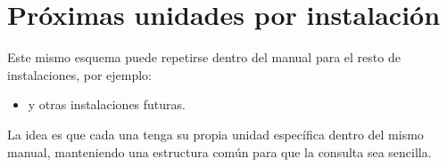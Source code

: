 \documentclass[12pt,a4paper]{article}
\begin{document}
\section{Próximas unidades por instalación}

Este mismo esquema puede repetirse dentro del manual para el resto de instalaciones, por ejemplo:

\begin{itemize}
\item y otras instalaciones futuras.
\end{itemize}

La idea es que cada una tenga su propia unidad específica dentro del mismo manual, manteniendo una estructura común para que la consulta sea sencilla.
\end{document}
